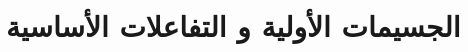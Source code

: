 \chapter{الجسيمات اﻷولية و التفاعلات اﻷساسية} %
\label{Chapter1}
\renewcommand{\theequation}{\arabic{chapter}.\arabic{equation}}

\newcommand{\keyword}[1]{\textbf{#1}}
\newcommand{\tabhead}[1]{\textbf{#1}}
\newcommand{\code}[1]{\texttt{#1}}


